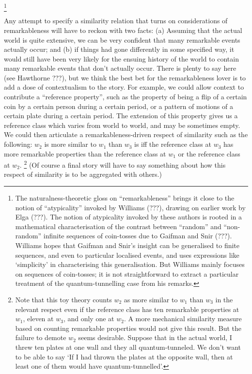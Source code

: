 \documentclass[leqno, 11pt, a5paper, openany]{article}
\begin{document}
\footnote{The naturalness-theoretic gloss on “remarkableness” brings it close to the notion of “atypicality” invoked by Williams (???), drawing on earlier work by Elga (???). The notion of atypicality invoked by these authors is rooted in a mathematical characterisation of the contrast between “random” and “non-random” infinite sequences of coin-tosses due to Gaifman and Snir (???). Williams hopes that Gaifman and Snir's insight can be generalised to finite sequences, and even to particular localised events, and uses expressions like ‘simplicity’ in characterising this generalisation. But Williams mainly focuses on sequences of coin-tosses; it is not straightforward to extract a particular treatment of the quantum-tunnelling case from his remarks.}

Any attempt to specify a similarity relation that turns on considerations of remarkableness will have to reckon with two facts: (a) Assuming that the actual world is quite extensive, we can be very confident that many remarkable events actually occur; and (b) if things had gone differently in some specified way, it would still have been very likely for the ensuing history of the world to contain many remarkable events that don't actually occur. There is plenty to say here (see Hawthorne ???), but we think the best bet for the remarkableness lover is to add a dose of contextualism to the story. For example, we could allow context to contribute a “reference property”, such as the property of being a flip of a certain coin by a certain person during a certain period, or a pattern of motions of a certain plate during a certain period. The extension of this property gives us a reference class which varies from world to world, and may be sometimes empty. We could then articulate a remarkableness-driven respect of similarity such as the following: $w_2$ is more similar to $w_1$ than $w_3$ is iff the reference class at $w_3$ has more remarkable properties than the reference class at $w_1$ or the reference class at $w_2$.%
\footnote{Note that this toy theory counts $w_2$ as more similar to $w_1$ than $w_3$ in the relevant respect even if the reference class has ten remarkable properties at $w_1$, eleven at $w_3$, and only one at $w_2$. A more mechanical similarity measure based on counting remarkable properties would not give this result. But the failure to demote $w_2$ seems desirable. Suppose that in the actual world, I threw ten plates at one wall and they all quantum-tunneled. We don't want to be able to say ‘If I had thrown the plates at the opposite wall, then at least one of them would have quantum-tunnelled’.} 
(Of course a final story will have to say something about how this respect of similarity is to be aggregated with others.)
\end{document}
